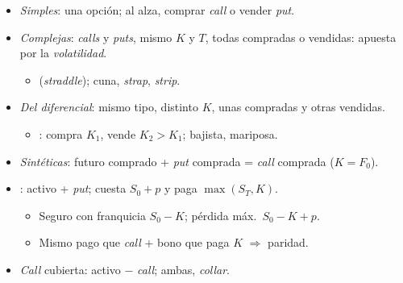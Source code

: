 \documentclass{article}
\begin{document}
\begin{columnas}
\begin{itemize}
\item \emph{Simples}: una opción; al alza, comprar \emph{call} o vender \emph{put}.
\item \emph{Complejas}: \emph{calls} y \emph{puts}, mismo $K$ y $T$, todas compradas o vendidas: apuesta por la \emph{volatilidad}.
  \begin{itemize}
  \item {} (\emph{straddle}); cuna, \emph{strap}, \emph{strip}.
  \end{itemize}
\item \emph{Del diferencial}: mismo tipo, distinto $K$, unas compradas y otras vendidas.
  \begin{itemize}
  \item {}: compra $K_1$, vende $K_2>K_1$; bajista, mariposa.
  \end{itemize}
\item \emph{Sintéticas}: futuro comprado + \emph{put} comprada = \emph{call} comprada ($K=F_0$).
\end{itemize}
\begin{itemize}
\item {}: activo + \emph{put}; cuesta $S_0+p$ y paga $\max(S_T,K)$.
  \begin{itemize}
  \item Seguro con franquicia $S_0-K$; pérdida máx.\ $S_0-K+p$.
  \item Mismo pago que \emph{call} + bono que paga $K$ $\Rightarrow$ paridad.
  \end{itemize}
\item \emph{Call} cubierta: activo $-$ \emph{call}; ambas, \emph{collar}.
\end{itemize}


\end{columnas}
\end{document}
